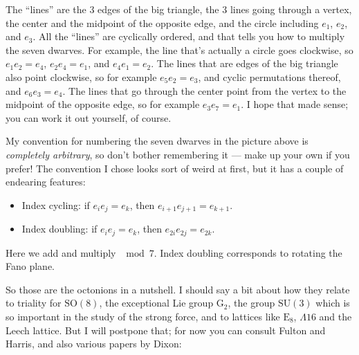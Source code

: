 \documentclass{article}
\def\tightlist{}
\renewcommand{\texttt}[1]{%
  \begingroup
  \ttfamily
  \begingroup\lccode`~=`/\lowercase{\endgroup\def~}{/\discretionary{}{}{}}%
  \begingroup\lccode`~=`[\lowercase{\endgroup\def~}{[\discretionary{}{}{}}%
  \begingroup\lccode`~=`.\lowercase{\endgroup\def~}{.\discretionary{}{}{}}%
  \catcode`/=\active\catcode`[=\active\catcode`.=\active
  \scantokens{#1\noexpand}%
  \endgroup
}
\begin{document}
The ``lines'' are the 3 edges of the big triangle, the 3 lines going
through a vertex, the center and the midpoint of the opposite edge, and
the circle including \(e_1\), \(e_2\), and \(e_3\). All the ``lines''
are cyclically ordered, and that tells you how to multiply the seven
dwarves. For example, the line that's actually a circle goes clockwise,
so \(e_1 e_2 = e_4\), \(e_2 e_4 = e_1\), and \(e_4 e_1 = e_2\). The
lines that are edges of the big triangle also point clockwise, so for
example \(e_5 e_2 = e_3\), and cyclic permutations thereof, and
\(e_6 e_3 = e_4\). The lines that go through the center point from the
vertex to the midpoint of the opposite edge, so for example
\(e_3 e_7 = e_1\). I hope that made sense; you can work it out yourself,
of course.

My convention for numbering the seven dwarves in the picture above is
\emph{completely arbitrary}, so don't bother remembering it --- make up
your own if you prefer! The convention I chose looks sort of weird at
first, but it has a couple of endearing features:

\begin{itemize}
\tightlist
\item
  Index cycling: if \(e_i e_j = e_k\), then
  \(e_{i+1} e_{j+1} = e_{k+1}\).
\item
  Index doubling: if \(e_i e_j = e_k\), then \(e_{2i} e_{2j} = e_{2k}\).
\end{itemize}

Here we add and multiply \(\mod 7\). Index doubling corresponds to
rotating the Fano plane.

So those are the octonions in a nutshell. I should say a bit about how
they relate to triality for \(\mathrm{SO}(8)\), the exceptional Lie
group \(\mathrm{G}_2\), the group \(\mathrm{SU}(3)\) which is so
important in the study of the strong force, and to lattices like
\(\mathrm{E}_8\), \(\Lambda 16\) and the Leech lattice. But I will
postpone that; for now you can consult Fulton and Harris, and also
various papers by Dixon:

\end{document}
